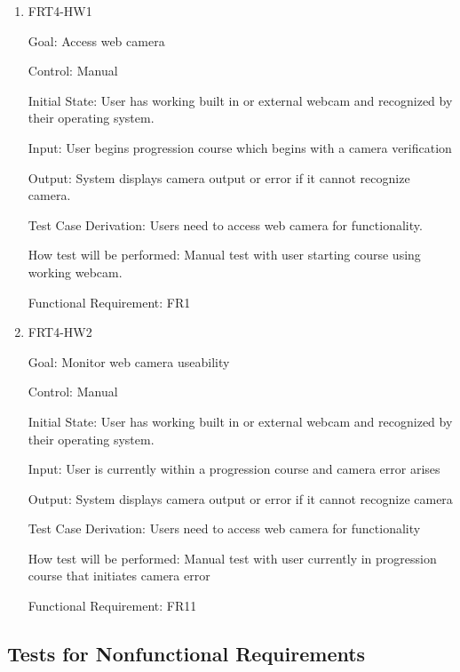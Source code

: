 \documentclass[12pt, titlepage]{article}
\begin{document}
\begin{enumerate}

\item{FRT4-HW1}

Goal: Access web camera

Control: Manual
					
Initial State: User has working built in or external webcam and recognized by their operating system.
					
Input: User begins progression course which begins with a camera verification
					
Output: System displays camera output or error if it cannot recognize camera.

Test Case Derivation: Users need to access web camera for functionality.
					
How test will be performed: Manual test with user starting course using working webcam.

Functional Requirement: FR1

\item{FRT4-HW2}

Goal: Monitor web camera useability

Control: Manual
					
Initial State: User has working built in or external webcam and recognized by their operating system.
					
Input: User is currently within a progression course and camera error arises
					
Output: System displays camera output or error if it cannot recognize camera

Test Case Derivation: Users need to access web camera for functionality
					
How test will be performed: Manual test with user currently in progression course that initiates camera error

Functional Requirement: FR11

\end{enumerate}

\subsection{Tests for Nonfunctional Requirements}

%
%
\end{document}
